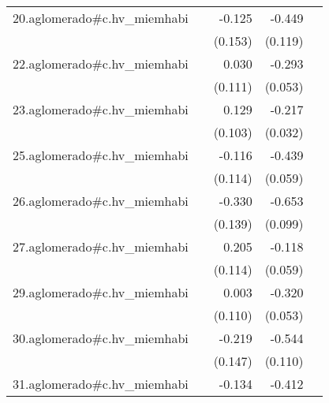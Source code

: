 {\begin{longtable}{l*{4}{D{.}{.}{-1}}}
\addlinespace
20.aglomerado#c.hv\_miemhabi&                     &      -0.125         &      -0.449\sym{***}&                     \\
            &                     &     (0.153)         &     (0.119)         &                     \\
\addlinespace
22.aglomerado#c.hv\_miemhabi&                     &       0.030         &      -0.293\sym{***}&                     \\
            &                     &     (0.111)         &     (0.053)         &                     \\
\addlinespace
23.aglomerado#c.hv\_miemhabi&                     &       0.129         &      -0.217\sym{***}&                     \\
            &                     &     (0.103)         &     (0.032)         &                     \\
\addlinespace
25.aglomerado#c.hv\_miemhabi&                     &      -0.116         &      -0.439\sym{***}&                     \\
            &                     &     (0.114)         &     (0.059)         &                     \\
\addlinespace
26.aglomerado#c.hv\_miemhabi&                     &      -0.330\sym{*}  &      -0.653\sym{***}&                     \\
            &                     &     (0.139)         &     (0.099)         &                     \\
\addlinespace
27.aglomerado#c.hv\_miemhabi&                     &       0.205         &      -0.118\sym{*}  &                     \\
            &                     &     (0.114)         &     (0.059)         &                     \\
\addlinespace
29.aglomerado#c.hv\_miemhabi&                     &       0.003         &      -0.320\sym{***}&                     \\
            &                     &     (0.110)         &     (0.053)         &                     \\
\addlinespace
30.aglomerado#c.hv\_miemhabi&                     &      -0.219         &      -0.544\sym{***}&                     \\
            &                     &     (0.147)         &     (0.110)         &                     \\
\addlinespace
31.aglomerado#c.hv\_miemhabi&                     &      -0.134         &      -0.412\sym{***}&                     \\

\end{longtable}}
